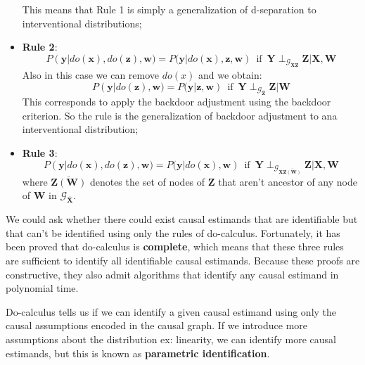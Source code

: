 \begin{definition}
\begin{itemize}
              This means that Rule 1 is simply a generalization of d-separation to
              interventional distributions;
        \item \textbf{Rule 2}:
              \begin{equation}
                  P(\mathbf{y} | do(\mathbf{x}), do(\mathbf{z}), \mathbf{w}) =
                  P(\mathbf{y} | do(\mathbf{x}), \mathbf{z}, \mathbf{w}) \,
                  \text{ if } \, \mathbf{Y} \perp_{\mathcal{G}_{\overline{\mathbf{X}}\underline{\mathbf{Z}}}} \mathbf{Z} | \mathbf{X}, \mathbf{W}
              \end{equation}
              Also in this case we can remove $do(x)$ and we obtain:
              \begin{equation*}
                  P(\mathbf{y} | do(\mathbf{z}), \mathbf{w}) = P(\mathbf{y} | \mathbf{z}, \mathbf{w}) \,
                  \text{ if } \, \mathbf{Y} \perp_{\mathcal{G}_{\overline{\mathbf{Z}}}} \mathbf{Z} | \mathbf{W}
              \end{equation*}
              This corresponds to apply the backdoor adjustment using the backdoor
              criterion. So the rule is the generalization of backdoor adjustment to
              ana interventional distribution;
        \item \textbf{Rule 3}:
              \begin{equation}
                  P(\mathbf{y} | do(\mathbf{x}), do(\mathbf{z}), \mathbf{w}) =
                  P(\mathbf{y} | do(\mathbf{x}), \mathbf{w}) \, \text{ if } \,
                  \mathbf{Y} \perp_{\mathcal{G}_{\overline{\mathbf{X}}\overline{\mathbf{Z}(\mathbf{W})}}} \mathbf{Z} | \mathbf{X}, \mathbf{W}
              \end{equation}
              where $\overline{\mathbf{Z}(\mathbf{W})}$ denotes the set of nodes
              of $\mathbf{Z}$ that aren't ancestor of any node of $\mathbf{W}$
              in $\mathcal{G}_{\overline{\mathbf{X}}}$.
    \end{itemize}
\end{definition}
We could ask whether there could exist causal estimands that are identifiable but
that can't be identified using only the rules of do-calculus. Fortunately, it
has been proved that do-calculus is \textbf{complete}, which means that these
three rules are sufficient to identify all identifiable causal estimands. Because
these proofs are constructive, they also admit algorithms that identify any causal
estimand in polynomial time.

Do-calculus tells us if we can identify a given causal estimand using only the
causal assumptions encoded in the causal graph. If we introduce more assumptions
about the distribution ex: linearity, we can identify more causal estimands, but
this is known as \textbf{parametric identification}.

